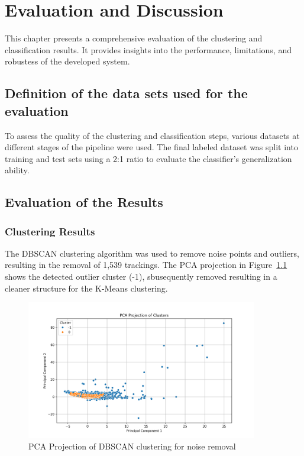 \documentclass[a4paper,12pt,twoside]{scrreprt}
\begin{document}
\chapter{Evaluation and Discussion}

This chapter presents a comprehensive evaluation of the clustering and
classification results.
It provides insights into the performance, limitations, and robustess of the
developed system.

\section{Definition of the data sets used for the evaluation}

To assess the quality of the clustering and classification steps, various
datasets at different stages of the pipeline were used.
The final labeled dataset was split into training and test sets using a 2:1
ratio to evaluate the classifier's generalization ability.

\section{Evaluation of the Results}

\subsection{Clustering Results}

The DBSCAN clustering algorithm was used to remove noise points and outliers,
resulting in the removal of 1,539 trackings.
The PCA projection in Figure~\ref{fig:pca_dbscan} shows the detected outlier
cluster (-1), sbusequently removed resulting in a cleaner structure for the
K-Means clustering.

\begin{figure}[htbp]
  \centering

  \includegraphics[width=0.9\textwidth]{Figures/dbscan_diagram_feature_data.png}
  \caption{PCA Projection of DBSCAN clustering for noise removal}
  \label{fig:pca_dbscan}
\end{figure}
\FloatBarrier
\end{document}
